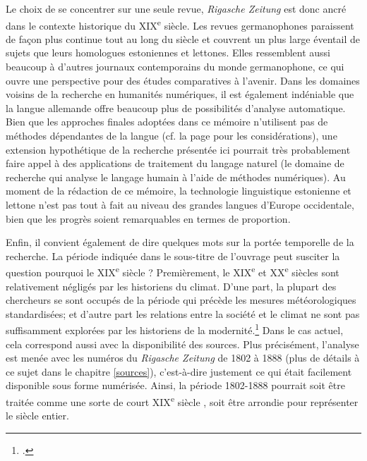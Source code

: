 \documentclass[a4paper,twoside,12pt]{article}
\begin{document}
Le choix de se concentrer sur une seule revue, \textit{Rigasche Zeitung} est donc ancré dans le contexte historique du XIX\textsuperscript{e} siècle. Les revues germanophones paraissent de façon plus continue tout au long du siècle et couvrent un plus large éventail de sujets que leurs homologues estoniennes et lettones. Elles ressemblent aussi beaucoup à d'autres journaux contemporains du monde germanophone, ce qui ouvre une perspective pour des études comparatives à l'avenir. Dans les domaines voisins de la recherche en humanités numériques, il est également indéniable que la langue allemande offre beaucoup plus de possibilités d'analyse automatique. Bien que les approches finales adoptées dans ce mémoire n'utilisent pas de méthodes dépendantes de la langue (cf. la page \pageref{NER_approach} pour les considérations), une extension hypothétique de la recherche présentée ici pourrait très probablement faire appel à des applications de traitement du langage naturel (le domaine de recherche qui analyse le langage humain à l'aide de méthodes numériques). Au moment de la rédaction de ce mémoire, la technologie linguistique estonienne et lettone n'est pas tout à fait au niveau des grandes langues d'Europe occidentale, bien que les progrès soient remarquables en termes de proportion.

Enfin, il convient également de dire quelques mots sur la portée temporelle de la recherche. La période indiquée dans le sous-titre de l'ouvrage peut susciter la question \og pourquoi le XIX\textsuperscript{e} siècle ? \fg{} Premièrement, le XIX\textsuperscript{e} et XX\textsuperscript{e} siècles sont relativement négligés par les historiens du climat. D'une part, la plupart des chercheurs se sont occupés de la période qui précède les mesures météorologiques standardisées; et d'autre part les relations entre la société et le climat ne sont pas suffisamment explorées par les historiens de la modernité.\footcite[][11-12]{white_palgrave_2018} Dans le cas actuel, cela correspond aussi avec la disponibilité des sources. Plus précisément, l'analyse est menée avec les numéros du \textit{Rigasche Zeitung} de 1802 à 1888 (plus de détails à ce sujet dans le chapitre \ref{sources}), c'est-à-dire justement ce qui était facilement disponible sous forme numérisée. Ainsi, la période 1802-1888 pourrait soit être traitée comme une sorte de \og court XIX\textsuperscript{e} siècle \fg{}, soit être arrondie pour représenter le siècle entier.
\end{document}
